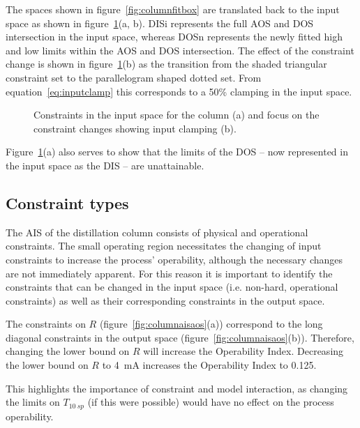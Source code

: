 \documentclass[final,authoryear,5pt,times,twocolumn]{elsarticle}
\begin{document}
The spaces shown in figure~\ref{fig:columnfitbox} are translated back to the input space as shown in figure~\ref{fig:columnconsinput}(a, b).
DISi represents the full AOS and DOS intersection in the input space, whereas DOSn represents the newly fitted high and low limits within the AOS and DOS intersection.
The effect of the constraint change is shown in figure~\ref{fig:columnconsinput}(b) as the transition from the shaded triangular constraint set to the parallelogram shaped dotted set.
From equation~\ref{eq:inputclamp} this corresponds to a 50\% clamping in the input space.

\begin{figure}[htbp]
  \centering
    \scalebox{1}{}
    \scalebox{1}{}
  \caption{Constraints in the input space for the column (a) and focus on the constraint changes showing input clamping (b).}
  \label{fig:columnconsinput}
\end{figure}

Figure~\ref{fig:columnconsinput}(a) also serves to show that the limits of the DOS -- now represented in the input space as the DIS -- are unattainable.

\subsection{Constraint types}
The AIS of the distillation column consists of physical and operational constraints.
The small operating region necessitates the changing of input constraints to increase the process' operability, although the necessary changes are not immediately apparent.
For this reason it is important to identify the constraints that can be changed in the input space (i.e. non-hard, operational constraints) as well as their corresponding constraints in the output space.

The constraints on $R$ (figure~\ref{fig:columnaisaos}(a)) correspond to the long diagonal constraints in the output space (figure~\ref{fig:columnaisaos}(b)).
Therefore, changing the lower bound on $R$ will increase the Operability Index.
Decreasing the lower bound on $R$ to 4~mA increases the Operability Index to 0.125.

This highlights the importance of constraint and model interaction, as changing the limits on $T_{10~sp}$ (if this were possible) would have no effect on the process operability.
\end{document}
